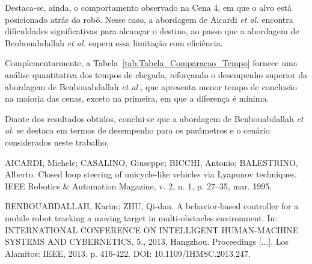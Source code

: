 \documentclass[conference]{IEEEtran}
\begin{document}
Destaca-se, ainda, o comportamento observado na Cena 4, em que o alvo está posicionado atrás do robô. Nesse caso, a abordagem de Aicardi \textit{et al.} encontra dificuldades significativas para alcançar o destino, ao passo que a abordagem de Benbouabdallah \textit{et al.} supera essa limitação com eficiência.

Complementarmente, a Tabela~\ref{tab:Tabela_Comparacao_Tempo} fornece uma análise quantitativa dos tempos de chegada, reforçando o desempenho superior da abordagem de Benbouabdallah \textit{et al.}, que apresenta menor tempo de conclusão na maioria das cenas, exceto na primeira, em que a diferença é mínima.

Diante dos resultados obtidos, conclui-se que a abordagem de Benbouabdallah \textit{et al.} se destaca em termos de desempenho para os parâmetros e o cenário considerados neste trabalho.



\begin{thebibliography}{00}
 AICARDI, Michele; CASALINO, Giuseppe; BICCHI, Antonio; BALESTRINO, Alberto. Closed loop steering of unicycle-like vehicles via Lyapunov techniques. IEEE Robotics \& Automation Magazine, v. 2, n. 1, p. 27–35, mar. 1995.

 BENBOUABDALLAH, Karim; ZHU, Qi-dan. A behavior-based controller for a mobile robot tracking a moving target in multi-obstacles environment. In: INTERNATIONAL CONFERENCE ON INTELLIGENT HUMAN-MACHINE SYSTEMS AND CYBERNETICS, 5., 2013, Hangzhou. Proceedings [...]. Los Alamitos: IEEE, 2013. p. 416-422. DOI: 10.1109/IHMSC.2013.247.
\end{thebibliography}
\end{document}
